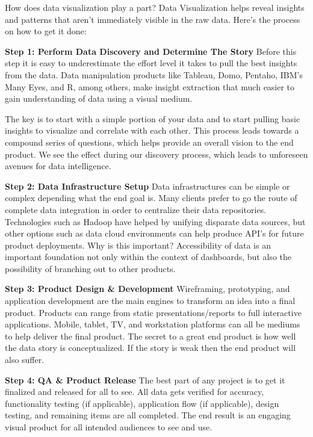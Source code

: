 \documentclass[]{book}
\theoremstyle{definition}
\theoremstyle{definition}
\theoremstyle{definition}
\theoremstyle{remark}
\begin{document}
How does data visualization play a part? Data Visualization helps reveal
insights and patterns that aren't immediately visible in the raw data.
Here's the process on how to get it done:

\textbf{Step 1: Perform Data Discovery and Determine The Story} Before
this step it is easy to underestimate the effort level it takes to pull
the best insights from the data. Data manipulation products like
Tableau, Domo, Pentaho, IBM's Many Eyes, and R, among others, make
insight extraction that much easier to gain understanding of data using
a visual medium.

The key is to start with a simple portion of your data and to start
pulling basic insights to visualize and correlate with each other. This
process leads towards a compound series of questions, which helps
provide an overall vision to the end product. We see the effect during
our discovery process, which leads to unforeseen avenues for data
intelligence.

\textbf{Step 2: Data Infrastructure Setup} Data infrastructures can be
simple or complex depending what the end goal is. Many clients prefer to
go the route of complete data integration in order to centralize their
data repositories. Technologies such as Hadoop have helped by unifying
disparate data sources, but other options such as data cloud
environments can help produce API's for future product deployments. Why
is this important? Accessibility of data is an important foundation not
only within the context of dashboards, but also the possibility of
branching out to other products.

\textbf{Step 3: Product Design \& Development} Wireframing, prototyping,
and application development are the main engines to transform an idea
into a final product. Products can range from static
presentations/reports to full interactive applications. Mobile, tablet,
TV, and workstation platforms can all be mediums to help deliver the
final product. The secret to a great end product is how well the data
story is conceptualized. If the story is weak then the end product will
also suffer.

\textbf{Step 4: QA \& Product Release} The best part of any project is
to get it finalized and released for all to see. All data gets verified
for accuracy, functionality testing (if applicable), application flow
(if applicable), design testing, and remaining items are all completed.
The end result is an engaging visual product for all intended audiences
to see and use.
\end{document}
